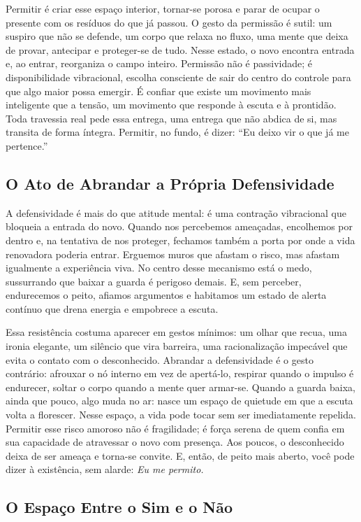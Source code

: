 \documentclass[12pt]{book}
\begin{document}
Permitir é criar esse espaço interior, tornar-se porosa e parar de ocupar o presente com os resíduos do que já passou. O gesto da permissão é sutil: um suspiro que não se defende, um corpo que relaxa no fluxo, uma mente que deixa de provar, antecipar e proteger-se de tudo. Nesse estado, o novo encontra entrada e, ao entrar, reorganiza o campo inteiro. Permissão não é passividade; é disponibilidade vibracional, escolha consciente de sair do centro do controle para que algo maior possa emergir. É confiar que existe um movimento mais inteligente que a tensão, um movimento que responde à escuta e à prontidão. Toda travessia real pede essa entrega, uma entrega que não abdica de si, mas transita de forma íntegra. Permitir, no fundo, é dizer: \enquote{Eu deixo vir o que já me pertence.}

\subsection*{O Ato de Abrandar a Própria Defensividade}

A defensividade é mais do que atitude mental: é uma contração vibracional que bloqueia a entrada do novo. Quando nos percebemos ameaçadas, encolhemos por dentro e, na tentativa de nos proteger, fechamos também a porta por onde a vida renovadora poderia entrar. Erguemos muros que afastam o risco, mas afastam igualmente a experiência viva. No centro desse mecanismo está o medo, sussurrando que baixar a guarda é perigoso demais. E, sem perceber, endurecemos o peito, afiamos argumentos e habitamos um estado de alerta contínuo que drena energia e empobrece a escuta.

Essa resistência costuma aparecer em gestos mínimos: um olhar que recua, uma ironia elegante, um silêncio que vira barreira, uma racionalização impecável que evita o contato com o desconhecido. Abrandar a defensividade é o gesto contrário: afrouxar o nó interno em vez de apertá-lo, respirar quando o impulso é endurecer, soltar o corpo quando a mente quer armar-se. Quando a guarda baixa, ainda que pouco, algo muda no ar: nasce um espaço de quietude em que a escuta volta a florescer. Nesse espaço, a vida pode tocar sem ser imediatamente repelida. Permitir esse risco amoroso não é fragilidade; é força serena de quem confia em sua capacidade de atravessar o novo com presença. Aos poucos, o desconhecido deixa de ser ameaça e torna-se convite. E, então, de peito mais aberto, você pode dizer à existência, sem alarde: \textit{Eu me permito.}

\subsection*{O Espaço Entre o Sim e o Não}
\end{document}
